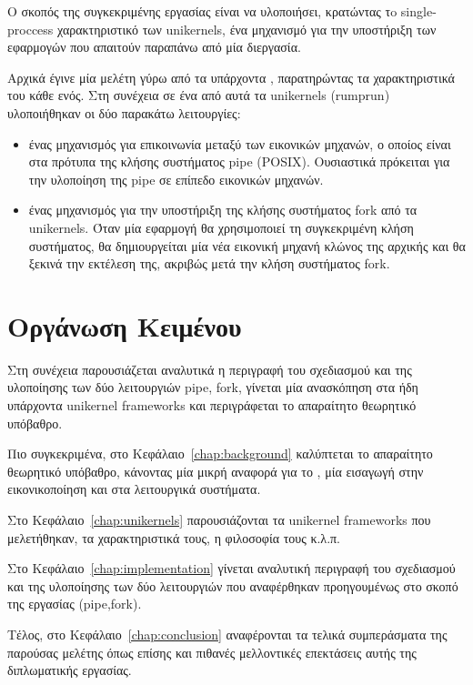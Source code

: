 Ο σκοπός της συγκεκριμένης εργασίας είναι να υλοποιήσει, κρατώντας τo
single-proccess χαρακτηριστικό των unikernels, ένα μηχανισμό για την υποστήριξη
των εφαρμογών που απαιτούν παραπάνω από μία διεργασία. 

Αρχικά έγινε μία μελέτη γύρω από τα υπάρχοντα , παρατηρώντας
τα χαρακτηριστικά του κάθε ενός. Στη συνέχεια σε ένα από αυτά τα unikernels
(rumprun) υλοποιήθηκαν οι δύο παρακάτω λειτουργίες:

\begin{itemize}
\item ένας μηχανισμός για επικοινωνία μεταξύ των εικονικών μηχανών, ο οποίος
	είναι στα πρότυπα της κλήσης συστήματος pipe (POSIX). Ουσιαστικά
		πρόκειται για την υλοποίηση της pipe σε επίπεδο εικονικών
		μηχανών. 
\item  ένας μηχανισμός για την υποστήριξη της κλήσης συστήματος fork από τα
unikernels. Όταν μία εφαρμογή θα χρησιμοποιεί τη συγκεκριμένη κλήση συστήματος,
θα δημιουργείται μία νέα εικονική μηχανή κλώνος της αρχικής και θα ξεκινά την
εκτέλεση της, ακριβώς μετά την κλήση συστήματος fork.
\end{itemize}

\section{Οργάνωση Κειμένου}
Στη συνέχεια παρουσιάζεται αναλυτικά η περιγραφή του σχεδιασμού και της
υλοποίησης των δύο λειτουργιών pipe, fork, γίνεται μία ανασκόπηση στα ήδη
υπάρχοντα unikernel frameworks και περιγράφεται το απαραίτητο θεωρητικό υπόβαθρο.

Πιο συγκεκριμένα, στο Κεφάλαιο~\ref{chap:background} καλύπτεται το απαραίτητο
θεωρητικό υπόβαθρο, κάνοντας μία μικρή αναφορά για το , μία
εισαγωγή στην εικονικοποίηση και στα λειτουργικά συστήματα. 

Στο Κεφάλαιο~\ref{chap:unikernels} παρουσιάζονται τα unikernel frameworks που
μελετήθηκαν, τα χαρακτηριστικά τους, η φιλοσοφία τους κ.λ.π. 

Στο Κεφάλαιο~\ref{chap:implementation} γίνεται αναλυτική περιγραφή του
σχεδιασμού και της υλοποίησης των δύο λειτουργιών που αναφέρθηκαν προηγουμένως
στο σκοπό της εργασίας (pipe,fork). 

Τέλος, στο Κεφάλαιο~\ref{chap:conclusion} αναφέρονται τα τελικά συμπεράσματα
της παρούσας μελέτης όπως επίσης και πιθανές μελλοντικές επεκτάσεις αυτής της
διπλωματικής εργασίας. 
